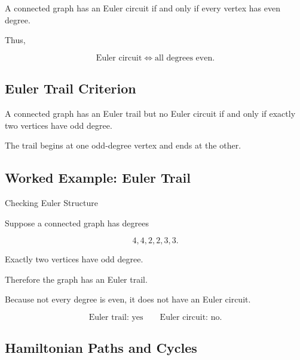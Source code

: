 \begin{theorem}
A connected graph has an Euler circuit if and only if every vertex has
even degree.
\end{theorem}

Thus,

\[
\boxed{
\text{Euler circuit}
\iff
\text{all degrees even}.
}
\]

\subsection{Euler Trail Criterion}
\label{subsec:euler-trail-criterion}

\begin{theorem}
A connected graph has an Euler trail but no Euler circuit if and only if
exactly two vertices have odd degree.
\end{theorem}

The trail begins at one odd-degree vertex and ends at the other.

\subsection{Worked Example: Euler Trail}
\label{subsec:worked-euler-trail}

\begin{workedexamplebox}{Checking Euler Structure}

Suppose a connected graph has degrees

\[
4,4,2,2,3,3.
\]

Exactly two vertices have odd degree.

Therefore the graph has an Euler trail.

Because not every degree is even, it does not have an Euler circuit.

\begin{answerbox}
\[
\boxed{
\text{Euler trail: yes}
\qquad
\text{Euler circuit: no}.
}
\]
\end{answerbox}

\end{workedexamplebox}

\subsection{Hamiltonian Paths and Cycles}
\label{subsec:hamiltonian-paths-cycles}

